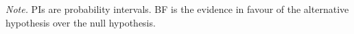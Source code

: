 \begin{appendix}
\begin{table}[b]
\begin{center}
\begin{threeparttable}
{}

\begin{tablenotes}[para]
\normalsize{\textit{Note.} PIs are probability intervals. BF is the evidence in favour of the alternative hypothesis over the null hypothesis.}
\end{tablenotes}

\end{threeparttable}
\end{center}

\end{table}
\end{appendix}
